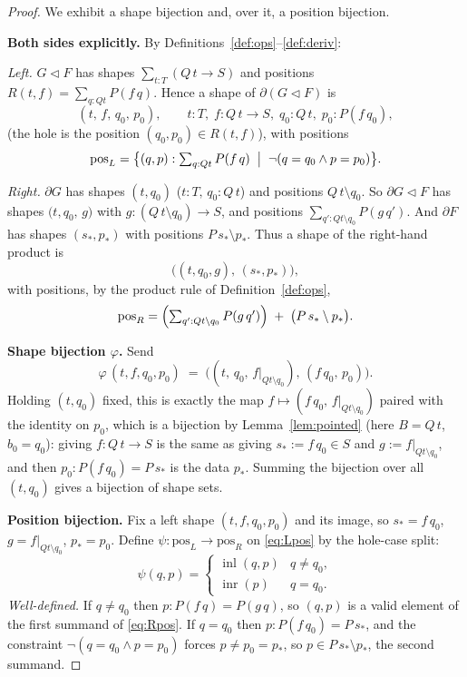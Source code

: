 \documentclass[11pt]{article}
\theoremstyle{definition}
\newcommand{\tri}{\mathbin{\triangleleft}}
\newcommand{\pd}{\partial}
\DeclareMathOperator{\inl}{inl}
\DeclareMathOperator{\inr}{inr}
\begin{document}
\begin{proof}
We exhibit a shape bijection and, over it, a position bijection.

\medskip\noindent\textbf{Both sides explicitly.}
By Definitions~\ref{def:ops}--\ref{def:deriv}:

\emph{Left.} $G\tri F$ has shapes $\sum_{t:T}(Q\,t\to S)$ and positions
$R(t,f) = \sum_{q:Q t}P(f\,q)$. Hence a shape of $\pd(G\tri F)$ is
\[
  (t,\,f,\,q_0,\,p_0),\qquad
  t:T,\; f:Q\,t\to S,\; q_0:Q\,t,\; p_0:P(f\,q_0),
\]
(the hole is the position $(q_0,p_0)\in R(t,f)$), with positions
\begin{equation}\label{eq:Lpos}
  \mathrm{pos}_L = \bigl\{(q,p) : \textstyle\sum_{q:Qt}P(f\,q) \;\bigm|\; \lnot(q=q_0 \wedge p=p_0)\bigr\}.
\end{equation}

\emph{Right.} $\pd G$ has shapes $(t,q_0)$ ($t:T,\,q_0:Q\,t$) and positions
$Q\,t\setminus q_0$. So $\pd G \tri F$ has shapes
$\bigl(t,q_0,\,g\bigr)$ with $g : (Q\,t\setminus q_0)\to S$, and positions
$\sum_{q':Qt\setminus q_0} P(g\,q')$. And $\pd F$ has shapes $(s_\ast,p_\ast)$
with positions $P\,s_\ast\setminus p_\ast$. Thus a shape of the right-hand
product is
\[
  \bigl((t,q_0,g),\,(s_\ast,p_\ast)\bigr),
\]
with positions, by the product rule of Definition~\ref{def:ops},
\begin{equation}\label{eq:Rpos}
  \mathrm{pos}_R = \Bigl(\textstyle\sum_{q':Qt\setminus q_0} P(g\,q')\Bigr)
                   \;+\; \bigl(P\,s_\ast \setminus p_\ast\bigr).
\end{equation}

\medskip\noindent\textbf{Shape bijection $\varphi$.}
Send
\[
  \varphi\,(t,f,q_0,p_0) \;=\; \bigl((t,\,q_0,\,f|_{Q t\setminus q_0}),\,(f\,q_0,\,p_0)\bigr).
\]
Holding $(t,q_0)$ fixed, this is exactly the map
$f \mapsto (f\,q_0,\,f|_{Qt\setminus q_0})$ paired with the identity on $p_0$,
which is a bijection by Lemma~\ref{lem:pointed} (here $B = Q\,t$, $b_0 = q_0$):
giving $f:Q\,t\to S$ is the same as giving $s_\ast := f\,q_0 \in S$ and
$g := f|_{Qt\setminus q_0}$, and then $p_0 : P(f\,q_0) = P\,s_\ast$ is the data
$p_\ast$. Summing the bijection over all $(t,q_0)$ gives a bijection of shape
sets.

\medskip\noindent\textbf{Position bijection.}
Fix a left shape $(t,f,q_0,p_0)$ and its image, so $s_\ast = f\,q_0$,
$g = f|_{Qt\setminus q_0}$, $p_\ast = p_0$. Define
$\psi : \mathrm{pos}_L \to \mathrm{pos}_R$ on \eqref{eq:Lpos} by the hole-case split:
\[
  \psi(q,p) =
  \begin{cases}
    \inl(q,p) & q \neq q_0,\\[2pt]
    \inr(p)   & q = q_0.
  \end{cases}
\]
\emph{Well-defined.} If $q\neq q_0$ then $p : P(f\,q) = P(g\,q)$, so $(q,p)$ is a
valid element of the first summand of \eqref{eq:Rpos}. If $q = q_0$ then
$p : P(f\,q_0) = P\,s_\ast$, and the constraint $\lnot(q=q_0\wedge p=p_0)$ forces
$p \neq p_0 = p_\ast$, so $p \in P\,s_\ast\setminus p_\ast$, the second summand.


\end{proof}
\end{document}
